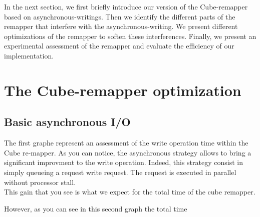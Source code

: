 \documentclass[12pt]{article}											%
\begin{document}
	In the next section, we first briefly introduce our version of the Cube-remapper based on asynchronous-writings.   Then we identify the different parts of the remapper that interfere with the asynchronous-writing.   We present different optimizations of the remapper to soften these interferences.   Finally, we present an experimental assessment of the remapper and evaluate the efficiency of our implementation.\\


\section{The Cube-remapper optimization}
	\subsection{Basic asynchronous I/O}
	The first graphe represent an assessment of the write operation time within the Cube re-mapper.   As you can notice, the asynchronous strategy allows to bring a significant improvment to the write operation.   Indeed, this strategy consist in simply queueing a request write request.   The request is executed in parallel without processor stall.\\
	This gain that you see is what we expect for the total time of the cube remapper.

	However, as you can see in this second graph the total time 
	
\end{document}
